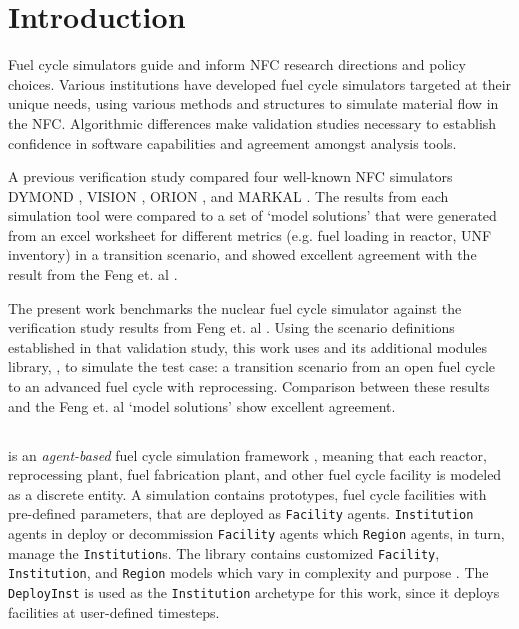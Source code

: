 
\section{Introduction}
Fuel cycle simulators guide and inform \gls{NFC} research directions and policy choices.
Various institutions have developed fuel cycle simulators targeted at their unique needs,
using various methods and structures
to simulate material flow in the \gls{NFC}.
Algorithmic differences make
validation studies necessary to establish
confidence in software capabilities and
agreement amongst analysis tools.

A previous verification study \cite{feng_standardized_2016} compared
four well-known \gls{NFC} simulators
DYMOND \cite{yacout_modeling_2005},
VISION \cite{jacobson_verifiable_2010},
ORION \cite{gregg_analysis_2012}, and
MARKAL \cite{shay_epa_2006}. The results from each simulation tool
were compared to a set of `model solutions' that were generated
from an excel worksheet for different metrics (e.g. fuel loading in reactor,
\gls{UNF} inventory) in a transition scenario, and showed excellent agreement
with the result from the Feng et. al \cite{feng_standardized_2016}.

The present work benchmarks the \Cyclus nuclear fuel cycle simulator 
\cite{huff_fundamental_2014}
against the verification study results from Feng et. al 
\cite{feng_standardized_2016}.
Using the scenario definitions established in that validation study,
this work uses \Cyclus and its additional modules library, \Cycamore, to simulate the test case: a transition scenario from an
open fuel cycle to an advanced fuel cycle with
reprocessing. Comparison between these results and the Feng et. al `model solutions'
show excellent agreement.


\subsection{\Cyclus}

\Cyclus is an \emph{agent-based} fuel cycle simulation framework 
\cite{huff_fundamental_2016}, meaning 
that each reactor, reprocessing plant, fuel fabrication plant, and other fuel cycle
facility is modeled as a discrete entity.
A \Cyclus simulation contains prototypes, fuel cycle facilities with
pre-defined parameters, that are deployed as \texttt{Facility} agents.
\texttt{Institution} agents in \Cyclus deploy or decommission \texttt{Facility} 
agents which \texttt{Region} agents, in turn, manage the \texttt{Institution}s.
The \Cycamore library contains customized \texttt{Facility}, 
\texttt{Institution}, and \texttt{Region} models which vary in complexity and purpose \cite{huff_extensions_2014}.
The \Cycamore \texttt{DeployInst} is used as the \texttt{Institution} archetype for this 
 work, since it deploys facilities at user-defined timesteps.
